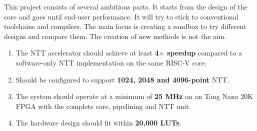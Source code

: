 \documentclass[a4paper, 12pt, titlepage]{article}
\begin{document}

This project consists of several ambitious parts. It starts from the design of the core and goes until end-user performance. It will try to stick to conventional toolchains and compilers. The main focus is creating a sandbox to try different designs and compare them. The creation of new methods is not the aim.  

\begin{enumerate}
  \item The NTT accelerator should achieve at least \textbf{4$\times$ speedup} compared to a software-only NTT implementation on the same RISC-V core.
  \item Should be configured to support \textbf{1024, 2048 and 4096-point} NTT.
  \item The system should operate at a minimum of \textbf{25 MHz} on an Tang Nano 20K FPGA with the complete core, pipelining and NTT unit.
  \item The hardware design should fit within \textbf{20,000 LUTs}.
\end{enumerate}

\newpage


\end{document}
